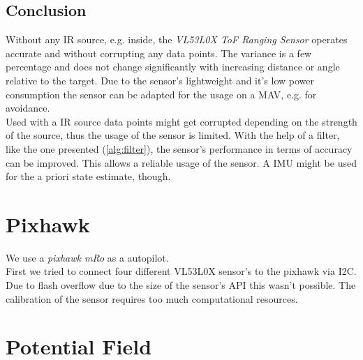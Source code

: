 \subsection{Conclusion}
Without any IR source, e.g. inside, the \textit{VL53L0X ToF Ranging Sensor} operates accurate and without corrupting any data points. The variance is a few percentage and does not change significantly with increasing distance or angle relative to the target. Due to the sensor's lightweight and it's low power consumption the sensor can be adapted for the usage on a MAV, e.g. for avoidance. \\
Used with a IR source data points might get corrupted depending on the strength of the source, thus the usage of the sensor is limited. With the help of a filter, like the one presented (\cref{alg:filter}), the sensor's performance in terms of accuracy can be improved. This allows a reliable usage of the sensor. A IMU might be used for the a priori state estimate, though. \\


\section{Pixhawk}
\label{sec:pixhawk}
We use a \textit{pixhawk mRo} as a autopilot. \\
First we tried to connect four different VL53L0X sensor's to the pixhawk via I2C. Due to flash overflow due to the size of the sensor's API this wasn't possible. The calibration of the sensor requires too much computational resources.



\section{Potential Field}
\label{sec:potential field}

